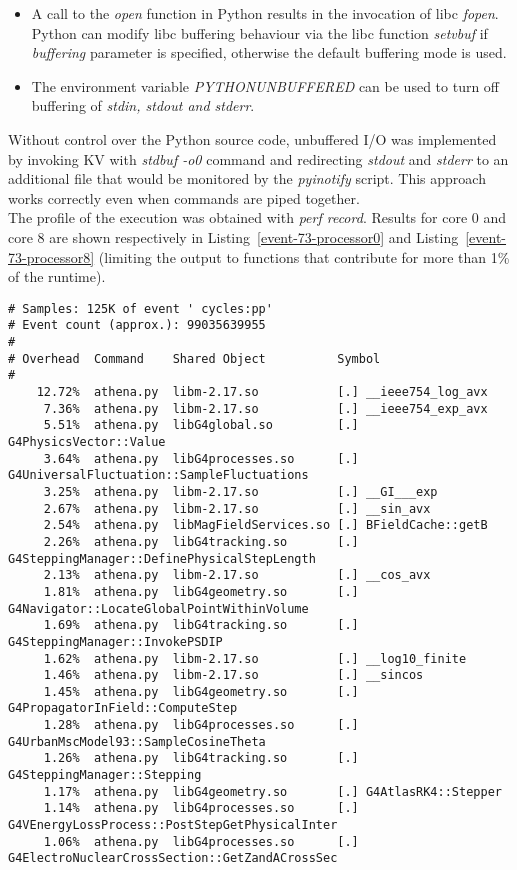 \documentclass[a4paper]{jpconf}
\begin{document}
\begin{itemize}
\item A call to the \textit{open} function in Python results in the invocation
of libc \textit{fopen}. Python can modify libc buffering behaviour via the libc
function \textit{setvbuf} if \textit{buffering} parameter is specified,
otherwise the default buffering mode is used.
\item The environment variable \textit{PYTHONUNBUFFERED} can be used to turn off
buffering of \textit{stdin, stdout and stderr}.
\end{itemize}
Without control over the Python source code, unbuffered I/O was implemented by 
invoking KV with \textit{stdbuf -o0} command and redirecting \textit{stdout} and \textit{stderr}
to an additional file that would be monitored by the \textit{pyinotify} script. This approach 
works correctly even when commands are piped together.
\\
The profile of the execution was obtained with \textit{perf record}.
Results for core 0
and core 8 are shown respectively in Listing~\ref{event-73-processor0} and
Listing~\ref{event-73-processor8} (limiting the output to functions that
contribute for more than 1\% of the runtime).

\begin{lstlisting}[caption=Recording of event 73 on core 0., label=event-73-processor0]
# Samples: 125K of event ' cycles:pp'
# Event count (approx.): 99035639955
#
# Overhead  Command    Shared Object          Symbol
#
    12.72%  athena.py  libm-2.17.so           [.] __ieee754_log_avx
     7.36%  athena.py  libm-2.17.so           [.] __ieee754_exp_avx
     5.51%  athena.py  libG4global.so         [.] G4PhysicsVector::Value
     3.64%  athena.py  libG4processes.so      [.] G4UniversalFluctuation::SampleFluctuations
     3.25%  athena.py  libm-2.17.so           [.] __GI___exp
     2.67%  athena.py  libm-2.17.so           [.] __sin_avx
     2.54%  athena.py  libMagFieldServices.so [.] BFieldCache::getB
     2.26%  athena.py  libG4tracking.so       [.] G4SteppingManager::DefinePhysicalStepLength
     2.13%  athena.py  libm-2.17.so           [.] __cos_avx
     1.81%  athena.py  libG4geometry.so       [.] G4Navigator::LocateGlobalPointWithinVolume
     1.69%  athena.py  libG4tracking.so       [.] G4SteppingManager::InvokePSDIP
     1.62%  athena.py  libm-2.17.so           [.] __log10_finite
     1.46%  athena.py  libm-2.17.so           [.] __sincos
     1.45%  athena.py  libG4geometry.so       [.] G4PropagatorInField::ComputeStep
     1.28%  athena.py  libG4processes.so      [.] G4UrbanMscModel93::SampleCosineTheta
     1.26%  athena.py  libG4tracking.so       [.] G4SteppingManager::Stepping
     1.17%  athena.py  libG4geometry.so       [.] G4AtlasRK4::Stepper
     1.14%  athena.py  libG4processes.so      [.] G4VEnergyLossProcess::PostStepGetPhysicalInter
     1.06%  athena.py  libG4processes.so      [.] G4ElectroNuclearCrossSection::GetZandACrossSec
\end{lstlisting}
\end{document}
